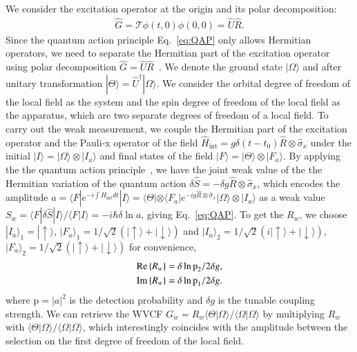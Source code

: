 \documentclass[twocolumn,pra,aps,superscriptaddress]{revtex4-2}
\begin{document}
We consider the excitation operator at the origin and its polar decomposition:
\begin{align}
\hat{G}=\mathcal{T} \phi(t,0) \phi(0,0)=\hat{U}\hat{R}.
\end{align}
Since the quantum action principle Eq.~\eqref{eq:QAP} only allows Hermitian operators, we need to separate the Hermitian part of the excitation operator using polar decomposition $\hat{G}=\hat{U}\hat{R}$~\cite{pati}. We denote the ground state $|\Omega\rangle$ and after unitary transformation $|\Theta\rangle=\hat{U}^{\dagger}|\Omega\rangle$.  We consider the orbital degree of freedom of the local field as the system and the spin degree of freedom of the local field as the apparatus, which are two separate degrees of freedom of a local field. To carry out the weak measurement, we couple the Hermitian part of the excitation operator and the Pauli-x operator of the field  $\hat{H}_{\text{int}}=g\delta(t-t_0)\hat{R}\otimes\hat{\sigma}_x$ under the initial  $|I\rangle=|\Omega\rangle\otimes|I_a\rangle$ and final states of the field $|F\rangle=|\Theta\rangle\otimes| F_a\rangle$. By applying the the quantum action principle~\cite{GFJS,QAP}, we have the joint weak value of the the Hermitian variation of the quantum action $\delta\hat{S}=-\delta g\hat{R}\otimes\hat{\sigma}_x$, which encodes the amplitude $a=\langle F|e^{-i\int \hat{H} _{\text{int}} dt}|I\rangle=\langle\Theta|\otimes\langle F_a|e^{-ig\hat{R}\otimes\hat{\sigma}_x}|\Omega\rangle\otimes|I_a\rangle$ as a weak value $S_w=\langle F| \delta\hat{S}|I\rangle/\langle F|I\rangle=-i\hbar\delta\ln a$, giving Eq.~\eqref{eq:QAP}. To get the $R_w$, we choose $|I_a\rangle_1=|\uparrow\rangle $, $|F_a\rangle_1=1/\sqrt{2} \left(|\uparrow\rangle+|\downarrow \rangle \right)$ and $|I_a\rangle_2=1/\sqrt{2} \left(i|\uparrow\rangle+|\downarrow\rangle \right) $, $|F_a\rangle_2=1/\sqrt{2} \left(|\uparrow\rangle+|\downarrow\rangle \right)$ for convenience,
\begin{align}\label{WMRw}
\text{Re}\left\{ R_{w}\right\} &= \delta\ln \text{p}_{2}/{2\delta g}\notag,\\
\text{Im}\left\{ R_{w}\right\} &= \delta\ln \text{p}_{1}/{2\delta g}.
\end{align}
where $\text{p}=|a|^2$ is the detection probability and $\delta g$ is the tunable coupling strength. We can retrieve the WVCF $G_w=R_w{\langle \Theta|\Omega\rangle}/{\langle\Omega|\Omega\rangle}$ by multiplying $R_w$ with ${\langle \Theta|\Omega\rangle}/{\langle\Omega|\Omega\rangle}$, which interestingly coincides with the amplitude between the selection on the first degree of freedom of the local field.
\end{document}
